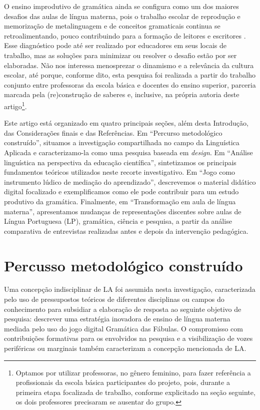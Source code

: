 O ensino improdutivo de gramática ainda se configura como um dos maiores
desafios das aulas de língua materna, pois o trabalho escolar de
reprodução e memorização de metalinguagem e de conceitos gramaticais
continua se retroalimentando, pouco contribuindo para a formação de
leitores e escritores \cite{silva_construcao_2019}. Esse diagnóstico
pode até ser realizado por educadores em seus locais de trabalho, mas as
soluções para minimizar ou resolver o desafio estão por ser elaboradas.
Não nos interessa menosprezar o dinamismo e a relevância da cultura
escolar, até porque, conforme dito, esta pesquisa foi realizada a partir
do trabalho conjunto entre professoras da escola básica e docentes do
ensino superior, parceria marcada pela (re)construção de saberes e,
inclusive, na própria autoria deste artigo\footnote{ Optamos por
	utilizar professoras, no gênero feminino, para fazer referência a
	profissionais da escola básica participantes do projeto, pois, durante
	a primeira etapa focalizada de trabalho, conforme explicitado na seção
	seguinte, os dois professores precisaram se ausentar do grupo.}.

Este artigo está organizado em quatro principais seções, além desta
Introdução, das Considerações finais e das Referências. Em ``Percurso
metodológico construído'', situamos a investigação compartilhada no
campo da Linguística Aplicada e caracterizamo-la como uma pesquisa
baseada em \emph{design}. Em ``Análise linguística na perspectiva da
educação científica'', sintetizamos os principais fundamentos teóricos
utilizados neste recorte investigativo. Em ``Jogo como instrumento lúdico de mediação do aprendizado'', descrevemos o
material didático digital focalizado e exemplificamos como ele pode
contribuir para um estudo produtivo da gramática. Finalmente, em
``Transformação em aula de língua materna'', apresentamos mudanças de
representações discentes sobre aulas de Língua Portuguesa (LP),
gramática, ciência e pesquisa, a partir da análise comparativa de
entrevistas realizadas antes e depois da intervenção pedagógica.

\section{Percusso metodológico construído}\label{sec-Percussometodológicoconstruído}

Uma concepção indisciplinar de LA foi assumida nesta investigação,
caracterizada pelo uso de pressupostos teóricos de diferentes
disciplinas ou campos do conhecimento para subsidiar a elaboração de
resposta ao seguinte objetivo de pesquisa: descrever uma estratégia
inovadora de ensino de língua materna mediada pelo uso do jogo digital
Gramática das Fábulas. O compromisso com contribuições formativas para
os envolvidos na pesquisa e a visibilização de vozes periféricas ou
marginais também caracterizam a concepção mencionada de LA.

